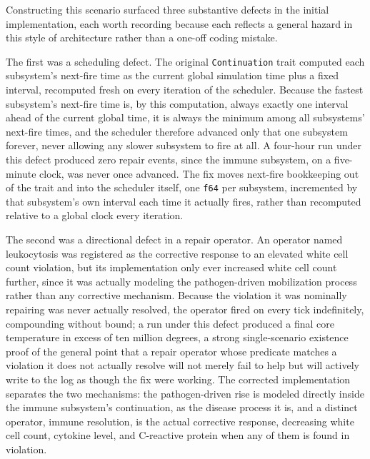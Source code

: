 \documentclass[11pt]{article}
\begin{document}
Constructing this scenario surfaced three substantive defects in the initial implementation, each worth recording because each reflects a general hazard in this style of architecture rather than a one-off coding mistake.

The first was a scheduling defect. The original \texttt{Continuation} trait computed each subsystem's next-fire time as the current global simulation time plus a fixed interval, recomputed fresh on every iteration of the scheduler. Because the fastest subsystem's next-fire time is, by this computation, always exactly one interval ahead of the current global time, it is always the minimum among all subsystems' next-fire times, and the scheduler therefore advanced only that one subsystem forever, never allowing any slower subsystem to fire at all. A four-hour run under this defect produced zero repair events, since the immune subsystem, on a five-minute clock, was never once advanced. The fix moves next-fire bookkeeping out of the trait and into the scheduler itself, one \texttt{f64} per subsystem, incremented by that subsystem's own interval each time it actually fires, rather than recomputed relative to a global clock every iteration.

The second was a directional defect in a repair operator. An operator named leukocytosis was registered as the corrective response to an elevated white cell count violation, but its implementation only ever increased white cell count further, since it was actually modeling the pathogen-driven mobilization process rather than any corrective mechanism. Because the violation it was nominally repairing was never actually resolved, the operator fired on every tick indefinitely, compounding without bound; a run under this defect produced a final core temperature in excess of ten million degrees, a strong single-scenario existence proof of the general point that a repair operator whose predicate matches a violation it does not actually resolve will not merely fail to help but will actively write to the log as though the fix were working. The corrected implementation separates the two mechanisms: the pathogen-driven rise is modeled directly inside the immune subsystem's continuation, as the disease process it is, and a distinct operator, immune resolution, is the actual corrective response, decreasing white cell count, cytokine level, and C-reactive protein when any of them is found in violation.
\end{document}
